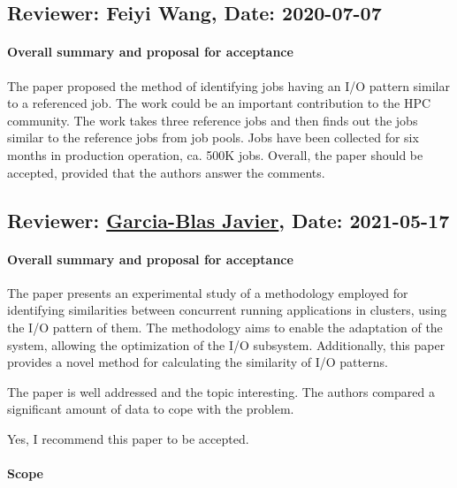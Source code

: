 \documentclass{jhps}
\begin{document}
\reviews   %

\subsection*{Reviewer: Feiyi Wang, Date: 2020-07-07}

\paragraph{Overall summary and proposal for acceptance}

The paper proposed the method of identifying jobs having an I/O pattern similar to a referenced job. The work could be an important contribution to the HPC community. The work takes three reference jobs and then finds out the jobs similar to the reference jobs from job pools. Jobs have been collected for six months in production operation, ca. 500K jobs.
Overall, the paper should be accepted, provided that the authors answer the comments.




\subsection*{Reviewer: \href{https://www.arcos.inf.uc3m.es/fjblas/}{Garcia-Blas Javier}, Date: 2021-05-17}

\paragraph{Overall summary and proposal for acceptance}

The paper presents an experimental study of a methodology employed for identifying similarities between concurrent running applications in clusters, using the I/O pattern of them. The methodology aims to enable the adaptation of the system, allowing the optimization of the I/O subsystem. Additionally, this paper provides a novel method for calculating the similarity of I/O patterns.

The paper is well addressed and the topic interesting. The authors compared a significant amount of data to cope with the problem.

Yes, I recommend this paper to be accepted.

\paragraph{Scope}   %
\end{document}

